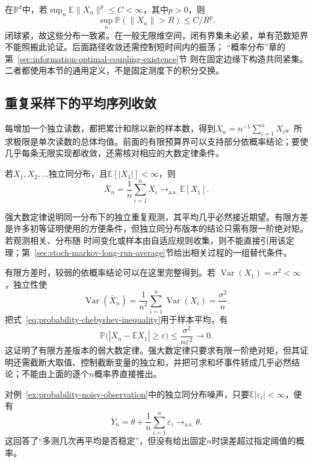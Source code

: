 在\(\mathbb R^d\)中，若\(\sup_n\mathbb E\|X_n\|^p\leq C<\infty\)，其中\(p>0\)，则
\[
\sup_n\mathbb P(\|X_n\|>R)\leq C/R^p.
\]
闭球紧，故这些分布一致紧。在一般无限维空间，闭有界集未必紧，单有范数矩界不能照搬此论证。后面路径收敛还需控制短时间内的振荡；
“概率分布”章的第~\ref{sec:information-optimal-coupling-existence}节
则在固定边缘下构造共同紧集。二者都使用本节的通用定义，不是固定测度下的积分交换。

\subsection{重复采样下的平均序列收敛}

每增加一个独立读数，都把累计和除以新的样本数，得到\(\overline X_n=n^{-1}\sum_{i=1}^nX_i\)。所求极限是单次读数的总体均值。前面的有限预算界可以支持部分依概率结论；要使几乎每条无限实现都收敛，还需核对相应的大数定律条件。
\label{sec:rv-aggregate-limits}
\begin{theorem}[强大数定律]
\label{thm:probability-strong-law-large-numbers}
若\(X_1,X_2,\ldots\)独立同分布，且\(\mathbb{E}[|X_1|]<\infty\)，则
\[ \overline{X}_n
  =\frac{1}{n}\sum_{i=1}^{n}X_i\to_{\mathrm{a.s.}}\mathbb{E}[X_1]. \]
\end{theorem}

强大数定律说明同一分布下的独立重复观测，其平均几乎必然接近期望。有限方差是许多初等证明使用的方便条件，但独立同分布版本的结论只需有限一阶绝对矩。若观测相关、分布随
时间变化或样本由自适应规则收集，则不能直接引用该定理；第~\ref{sec:stoch-markov-long-run-average}节给出相关过程的一组替代条件。

有限方差时，较弱的依概率结论可以在这里完整得到。若
\(\operatorname{Var}(X_1)=\sigma^2<\infty\)，独立性使
\[
  \operatorname{Var}(\overline{X}_n)
  =\frac{1}{n^2}\sum_{i=1}^{n}\operatorname{Var}(X_i)
  =\frac{\sigma^2}{n}.
\]
把式~\eqref{eq:probability-chebyshev-inequality}用于样本平均，有
\[
  \mathbb{P}\bigl(
    |\overline{X}_n-\mathbb{E}X_1|\geq\varepsilon
  \bigr)
  \leq\frac{\sigma^2}{n\varepsilon^2}\to0.
\]
这证明了有限方差版本的弱大数定律。强大数定律只要求有限一阶绝对矩，但其证明还需截断大取值、控制截断变量的独立和，并把可求和坏事件转成几乎必然结论；不能由上面的逐个\(n\)概率界直接推出。

对例~\ref{ex:probability-noisy-observation}中的独立同分布噪声，只要\(\mathbb{E}|\varepsilon_i|<\infty\)，便有
\[ \overline{Y}_n
  =\theta+\frac{1}{n}\sum_{i=1}^{n}\varepsilon_i\to_{\mathrm{a.s.}}\theta. \]
这回答了“多测几次再平均是否稳定”，但没有给出固定\(n\)时误差超过指定阈值的概率。

